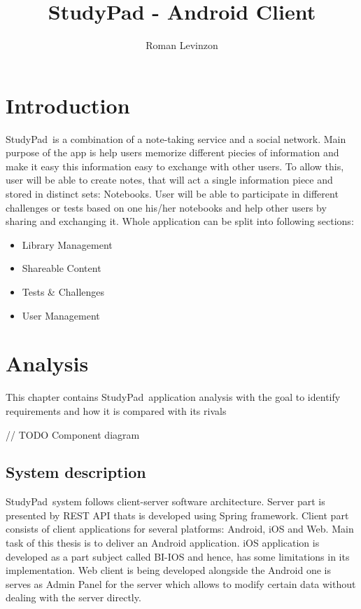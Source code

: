 \documentclass[thesis=B,english]{FITthesis}[2012/10/20]
\title{StudyPad - Android Client}
\author{Roman Levinzon} %
\newcommand{\appname}{StudyPad}
\begin{document}

\chapter{Introduction}

\appname\ is a combination of a note-taking service and a social network. Main purpose of the app is help users memorize different piecies  of information and make it easy this information easy to exchange with other users.
To allow this, user will be able to create notes, that will act a single information piece and stored in distinct sets: Notebooks. User will be able to participate in different challenges or tests based on one his/her notebooks and help other users by sharing and exchanging it. Whole application can be split into following sections:
	\begin{itemize}
		\item Library Management
		\item Shareable Content
		\item Tests \& Challenges
		\item User Management
	\end{itemize}
	
	
\newpage
\chapter{Analysis}

This chapter contains \appname\ application analysis with the goal to identify requirements and how it is compared with its rivals

// TODO Component diagram

\section{System description}
 \appname\ system follows client-server software architecture. Server part is presented by REST API thats is developed using Spring framework. Client part consists of  client applications for several platforms: Android, iOS and Web. Main task of this thesis is to deliver an Android application. iOS  application is developed as a part subject called BI-IOS and hence, has some limitations in its implementation. Web client is being developed alongside the Android one is serves as Admin Panel for the server which allows to modify certain data without dealing with the server directly.
 
\end{document}
